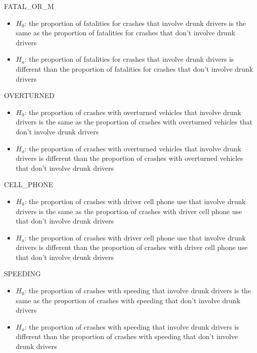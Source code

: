 \documentclass[
]{article}
\providecommand{\tightlist}{%
  \setlength{\itemsep}{0pt}\setlength{\parskip}{0pt}}
\begin{document}
FATAL\_OR\_M

\begin{itemize}
\tightlist
\item
  \(H_0\): the proportion of fatalities for crashes that involve drunk
  drivers is the same as the proportion of fatalities for crashes that
  don't involve drunk drivers
\item
  \(H_a\): the proportion of fatalities for crashes that involve drunk
  drivers is different than the proportion of fatalities for crashes
  that don't involve drunk drivers
\end{itemize}

OVERTURNED

\begin{itemize}
\tightlist
\item
  \(H_0\): the proportion of crashes with overturned vehicles that
  involve drunk drivers is the same as the proportion of crashes with
  overturned vehicles that don't involve drunk drivers
\item
  \(H_a\): the proportion of crashes with overturned vehicles that
  involve drunk drivers is different than the proportion of crashes with
  overturned vehicles that don't involve drunk drivers
\end{itemize}

CELL\_PHONE

\begin{itemize}
\tightlist
\item
  \(H_0\): the proportion of crashes with driver cell phone use that
  involve drunk drivers is the same as the proportion of crashes with
  driver cell phone use that don't involve drunk drivers
\item
  \(H_a\): the proportion of crashes with driver cell phone use that
  involve drunk drivers is different than the proportion of crashes with
  driver cell phone use that don't involve drunk drivers
\end{itemize}

SPEEDING

\begin{itemize}
\tightlist
\item
  \(H_0\): the proportion of crashes with speeding that involve drunk
  drivers is the same as the proportion of crashes with speeding that
  don't involve drunk drivers
\item
  \(H_a\): the proportion of crashes with speeding that involve drunk
  drivers is different than the proportion of crashes with speeding that
  don't involve drunk drivers
\end{itemize}
\end{document}

